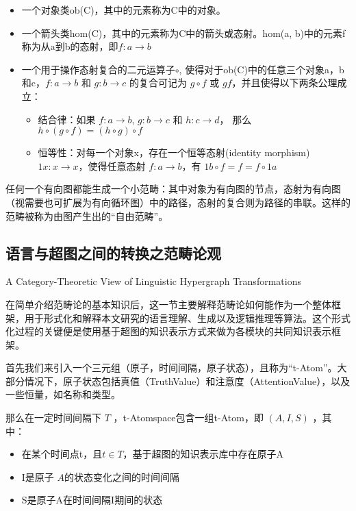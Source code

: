 \begin{itemize}
\item 一个对象类ob(C)，其中的元素称为C中的对象。
\item 一个箭头类hom(C)，其中的元素称为C中的箭头或态射。hom(a, b)中的元素f称为从a到b的态射，即$f : a \rightarrow b$
\item 一个用于操作态射复合的二元运算子$\circ$, 使得对于ob(C)中的任意三个对象a，b和c，$f : a \rightarrow b$ 和 $g : b \rightarrow c$ 的复合可记为 $g \circ f$ 或 $gf$，并且使得以下两条公理成立：

\begin{itemize}
\item 结合律：如果 $f : a \rightarrow b$, $g : b \rightarrow c$ 和 $h : c \rightarrow d$， 那么 $h \circ (g \circ f) = (h \circ g) \circ f$
\item 恒等性：对每一个对象x，存在一个恒等态射(identity morphism) $1x : x \rightarrow x$，使得任意态射 $f : a \rightarrow b$，有 $1b \circ f = f = f \circ 1a$ 
\end{itemize}
\end{itemize}

任何一个有向图都能生成一个小范畴：其中对象为有向图的节点，态射为有向图（视需要也可扩展为有向循环图）中的路径，态射的复合则为路径的串联。这样的范畴被称为由图产生出的“自由范畴”。


\subsection{语言与超图之间的转换之范畴论观}{A Category-Theoretic View of Linguistic Hypergraph Transformations}

在简单介绍范畴论的基本知识后，这一节主要解释范畴论如何能作为一个整体框架，用于形式化和解释本文研究的语言理解、生成以及逻辑推理等算法。这个形式化过程的关键便是使用基于超图的知识表示方式来做为各模块的共同知识表示框架。

首先我们来引入一个三元组（原子，时间间隔，原子状态），且称为“t-Atom”。大部分情况下，原子状态包括真值（TruthValue）和注意度（AttentionValue），以及一些恒量，如名称和类型。

那么在一定时间间隔下 $T$ ，t-Atomspace包含一组t-Atom，即 $(A,I,S)$ ，其中：

\begin{itemize}
\item 在某个时间点t，且$t \in T$，基于超图的知识表示库中存在原子A
\item I是原子 $A$的状态变化之间的时间间隔
\item S是原子A在时间间隔I期间的状态
\end{itemize}

